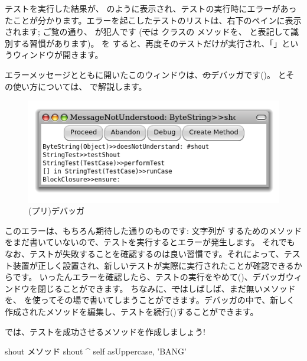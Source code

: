 \documentclass[a4paper,10pt,twoside]{book}
\begin{document}
テストを実行した結果が、 のように表示され、テストの実行時にエラーがあったことが分かります。エラーを起こしたテストのリストは、右下のペインに表示されます; ご覧の通り、 が犯人です
(\st では  クラスの  メソッドを、 と表記して識別する習慣があります)。
 を \click すると、再度そのテストだけが実行され、「」というウィンドウが開きます。

エラーメッセージとともに開いたこのウィンドウは、\st のデバッガです()。
とその使い方については、 で解説します。

\begin{figure}[hbt]
\centerline {\includegraphics[width=\textwidth]{Predebugger}}
\caption{(プリ)デバッガ}
\end{figure}

このエラーは、もちろん期待した通りのものです: 文字列が  するためのメソッドをまだ書いていないので、テストを実行するとエラーが発生します。
それでもなお、テストが失敗することを確認するのは良い習慣です。それによって、テスト装置が正しく設置され、新しいテストが実際に実行されたことが確認できるからです。
いったんエラーを確認したら、テストの実行をやめて()、デバッガウィンドウを閉じることができます。
ちなみに、\st ではしばしば、まだ無いメソッドを、 を使ってその場で書いてしまうことができます。デバッガの中で、新しく作成されたメソッドを編集し、テストを続行()することができます。

では、テストを成功させるメソッドを作成しましょう!

\begin{method}[shout]{shout メソッド}
shout
	^ self asUppercase, 'BANG'
\end{method}
\end{document}

